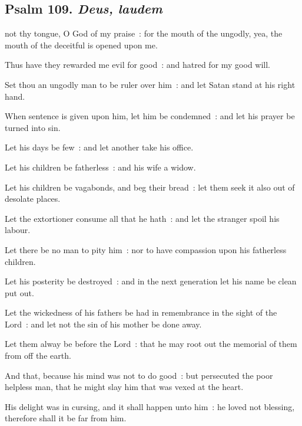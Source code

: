 \subsection{Psalm 109. \textit{Deus, laudem}}

 not thy tongue, O God of my praise~: for the mouth of the ungodly, yea, the mouth of the deceitful is opened upon me.\par
{}
Thus have they rewarded me evil for good~: and hatred for my good will.\par
{}Set thou an ungodly man to be ruler over him~: and let Satan stand at his right hand.\par
{}When sentence is given upon him, let him be condemned~: and let his prayer be turned into sin.\par
{}Let his days be few~: and let another take his office.\par
{}Let his children be fatherless~: and his wife a widow.\par
{}Let his children be vagabonds, and beg their bread~: let them seek it also out of desolate places.\par
{}Let the extortioner consume all that he hath~: and let the stranger spoil his labour.\par
{}Let there be no man to pity him~: nor to have compassion upon his fatherless children.\par
{}Let his posterity be destroyed~: and in the next generation let his name be clean put out.\par
{}Let the wickedness of his fathers be had in remembrance in the sight of the Lord~: and let not the sin of his mother be done away.\par
{}Let them alway be before the Lord~: that he may root out the memorial of them from off the earth.\par
{}And that, because his mind was not to do good~: but persecuted the poor helpless man, that he might slay him that was vexed at the heart.\par
{}His delight was in cursing, and it shall happen unto him~: he loved not blessing, therefore shall it be far from him.\par
